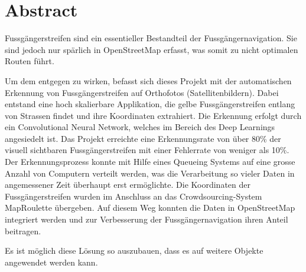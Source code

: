 \section{Abstract}

Fussgängerstreifen sind ein essentieller Bestandteil der Fussgängernavigation. Sie sind jedoch nur spärlich in OpenStreetMap erfasst, was somit zu nicht optimalen Routen führt.

Um dem entgegen zu wirken,  befasst sich dieses Projekt mit der automatischen Erkennung von Fussgängerstreifen auf Orthofotos (Satellitenbildern). 
Dabei entstand eine hoch skalierbare Applikation, die gelbe Fussgängerstreifen entlang von Strassen findet und ihre Koordinaten extrahiert. Die Erkennung erfolgt durch ein Convolutional Neural Network, welches im Bereich des Deep Learnings angesiedelt ist.
Das Projekt erreichte eine Erkennungsrate von über 80\% der visuell sichtbaren Fussgängerstreifen mit einer Fehlerrate von weniger als 10\%. Der Erkennungsprozess konnte mit Hilfe eines Queueing Systems auf eine grosse Anzahl von Computern verteilt werden, was die Verarbeitung so vieler Daten in angemessener Zeit überhaupt erst ermöglichte. Die Koordinaten der Fussgängerstreifen wurden im Anschluss an das Crowdsourcing-System MapRoulette übergeben. Auf diesem Weg konnten die Daten in OpenStreetMap integriert werden und zur Verbesserung der Fussgängernavigation ihren Anteil beitragen.

Es ist möglich diese Lösung so auszubauen, dass es auf weitere Objekte angewendet werden kann.
